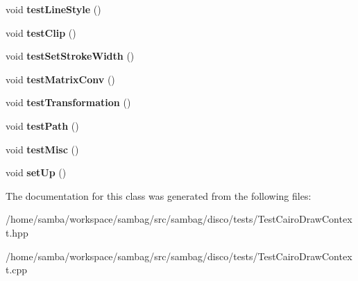 \begin{DoxyCompactItemize}
\item 
\hypertarget{classtests_1_1_test_cairo_draw_context_a1ad3d9f245651d2bb579e1fd29653b2b}{
void {\bfseries testLineStyle} ()}
\label{classtests_1_1_test_cairo_draw_context_a1ad3d9f245651d2bb579e1fd29653b2b}

\item 
\hypertarget{classtests_1_1_test_cairo_draw_context_a812e9d071824b1a681fc83ac694a0337}{
void {\bfseries testClip} ()}
\label{classtests_1_1_test_cairo_draw_context_a812e9d071824b1a681fc83ac694a0337}

\item 
\hypertarget{classtests_1_1_test_cairo_draw_context_a33175a3a9bb8fae87364ae68924bf3f5}{
void {\bfseries testSetStrokeWidth} ()}
\label{classtests_1_1_test_cairo_draw_context_a33175a3a9bb8fae87364ae68924bf3f5}

\item 
\hypertarget{classtests_1_1_test_cairo_draw_context_ac08572b7697cb6afc27e7e589c033b97}{
void {\bfseries testMatrixConv} ()}
\label{classtests_1_1_test_cairo_draw_context_ac08572b7697cb6afc27e7e589c033b97}

\item 
\hypertarget{classtests_1_1_test_cairo_draw_context_a3d54d5283f20ea353a192d965fddc7c9}{
void {\bfseries testTransformation} ()}
\label{classtests_1_1_test_cairo_draw_context_a3d54d5283f20ea353a192d965fddc7c9}

\item 
\hypertarget{classtests_1_1_test_cairo_draw_context_a0a0fb602448b2d5213429b9cc26dfaa3}{
void {\bfseries testPath} ()}
\label{classtests_1_1_test_cairo_draw_context_a0a0fb602448b2d5213429b9cc26dfaa3}

\item 
\hypertarget{classtests_1_1_test_cairo_draw_context_a70099dc058a04ede94590d5304ba33bf}{
void {\bfseries testMisc} ()}
\label{classtests_1_1_test_cairo_draw_context_a70099dc058a04ede94590d5304ba33bf}

\item 
\hypertarget{classtests_1_1_test_cairo_draw_context_ad44a8a0837f344ba8a33712c3bb04af6}{
void {\bfseries setUp} ()}
\label{classtests_1_1_test_cairo_draw_context_ad44a8a0837f344ba8a33712c3bb04af6}

\end{DoxyCompactItemize}


The documentation for this class was generated from the following files:\begin{DoxyCompactItemize}
\item 
/home/samba/workspace/sambag/src/sambag/disco/tests/TestCairoDrawContext.hpp\item 
/home/samba/workspace/sambag/src/sambag/disco/tests/TestCairoDrawContext.cpp\end{DoxyCompactItemize}
